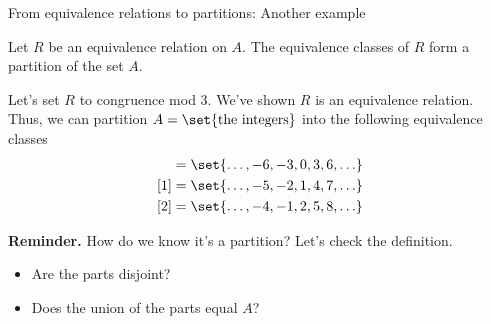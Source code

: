 \documentclass[10pt]{beamer}
\begin{document}
\begin{frame}{From equivalence relations to partitions: Another example}
\small 
 \begin{mygreenbox}[title=\text{Proposition (Scheinerman pp. 85)}]  
Let $R$ be an equivalence relation on $A$.  The equivalence classes of $R$ form a partition of the set $A$. 
\end{mygreenbox}
\vfill 
\begin{myredbox}[title=Example]
Let's set $R$ to congruence mod 3.  We've shown $R$ is an equivalence relation. Thus, we can partition $A= \set{\text{the integers}}$ into the following equivalence classes
%
\begin{align*}
[0] &= \set{\hdots, -6, -3, 0, 3, 6, \hdots} \\	
[1] &= \set{\hdots, -5, -2, 1, 4, 7, \hdots} \\	
[2] &= \set{\hdots, -4, -1, 2, 5, 8, \hdots}
\end{align*}
\end{myredbox}
\vfill
\pause 
\colorbox{blue!30}{\textbf{Reminder.}} How do we know it's a partition? \pause  Let's check the definition.
\begin{itemize}
\item Are the parts disjoint? \pause \greencheck  {}
\item Does the union of the parts equal $A$? \pause \greencheck 
\end{itemize}


\end{frame}


\end{document}
